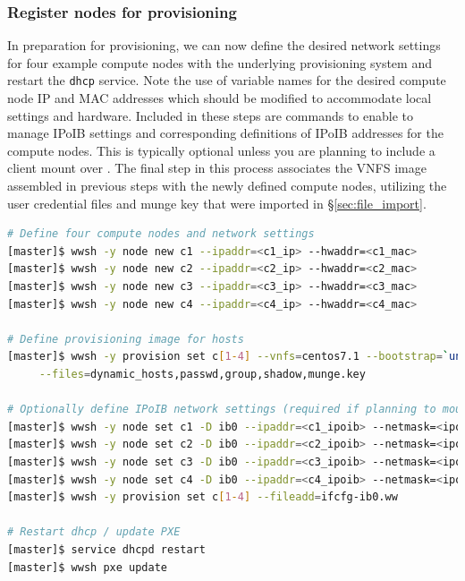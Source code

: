 \documentclass[letterpaper]{article}
\begin{document}
\subsubsection{Register nodes for provisioning}

In preparation for provisioning, we can now define the desired network settings
for four example compute nodes with the underlying provisioning system and
restart the \texttt{dhcp} service. Note the use of variable names for the
desired compute node IP and MAC addresses which should be modified to
accommodate local settings and hardware. Included in these steps are commands
to enable \Warewulf{} to manage IPoIB settings and corresponding definitions of
IPoIB addresses for the compute nodes. This is typically optional unless you
are planning to include a \Lustre{} client mount over \InfiniBand{}.  The final step
in this process associates the VNFS image assembled in previous steps with the
newly defined compute nodes, utilizing the user credential files and munge key
that were imported in \S\ref{sec:file_import}.


\begin{lstlisting}[language=bash,keywords={},upquote=true,basicstyle=\footnotesize\ttfamily]
# Define four compute nodes and network settings 
[master]$ wwsh -y node new c1 --ipaddr=<c1_ip> --hwaddr=<c1_mac> 
[master]$ wwsh -y node new c2 --ipaddr=<c2_ip> --hwaddr=<c2_mac> 
[master]$ wwsh -y node new c3 --ipaddr=<c3_ip> --hwaddr=<c3_mac> 
[master]$ wwsh -y node new c4 --ipaddr=<c4_ip> --hwaddr=<c4_mac> 

# Define provisioning image for hosts
[master]$ wwsh -y provision set c[1-4] --vnfs=centos7.1 --bootstrap=`uname -r` \
     --files=dynamic_hosts,passwd,group,shadow,munge.key 

# Optionally define IPoIB network settings (required if planning to mount Lustre* over IB)
[master]$ wwsh -y node set c1 -D ib0 --ipaddr=<c1_ipoib> --netmask=<ipoib_netmask>
[master]$ wwsh -y node set c2 -D ib0 --ipaddr=<c2_ipoib> --netmask=<ipoib_netmask>
[master]$ wwsh -y node set c3 -D ib0 --ipaddr=<c3_ipoib> --netmask=<ipoib_netmask>
[master]$ wwsh -y node set c4 -D ib0 --ipaddr=<c4_ipoib> --netmask=<ipoib_netmask>
[master]$ wwsh -y provision set c[1-4] --fileadd=ifcfg-ib0.ww

# Restart dhcp / update PXE
[master]$ service dhcpd restart
[master]$ wwsh pxe update
\end{lstlisting}
\end{document}

